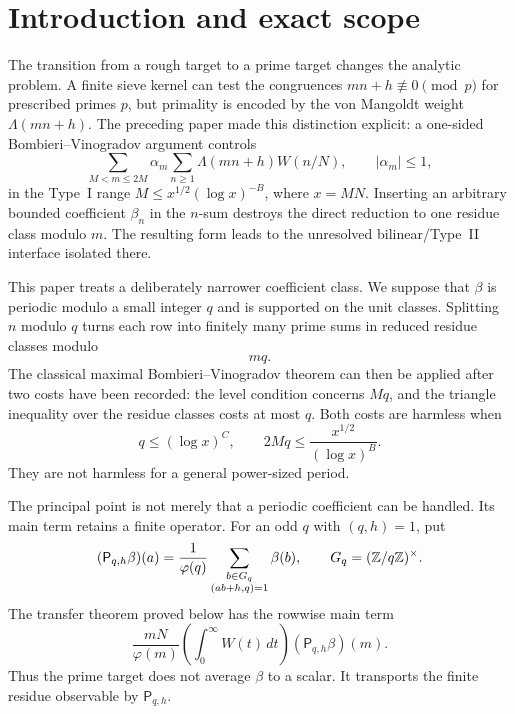 \section{Introduction and exact scope}
\label{sec:introduction}

The transition from a rough target to a prime target changes the analytic
problem.  A finite sieve kernel can test the congruences
$mn+h\not\equiv0\pmod p$ for prescribed primes $p$, but primality is encoded
by the von Mangoldt weight $\Lambda(mn+h)$.  The preceding paper
\citep{WangTPCSix2026} made this distinction explicit: a one-sided
Bombieri--Vinogradov argument controls
\begin{equation}\label{eq:intro-one-sided}
 \sum_{M<m\leq2M}\alpha_m
 \sum_{n\geq1}\Lambda(mn+h)W(n/N),
 \qquad |\alpha_m|\leq1,
\end{equation}
in the Type~I range $M\leq x^{1/2}(\log x)^{-B}$, where $x=MN$.
Inserting an arbitrary bounded coefficient $\beta_n$ in the $n$-sum destroys
the direct reduction to one residue class modulo $m$.  The resulting form
leads to the unresolved bilinear/Type~II interface isolated there.

This paper treats a deliberately narrower coefficient class.  We suppose
that $\beta$ is periodic modulo a small integer $q$ and is supported on the
unit classes.  Splitting $n$ modulo $q$ turns each row into finitely many
prime sums in reduced residue classes modulo
\begin{equation}\label{eq:intro-combined-modulus}
 mq.
\end{equation}
The classical maximal Bombieri--Vinogradov theorem can then be applied after
two costs have been recorded: the level condition concerns $Mq$, and the
triangle inequality over the residue classes costs at most $q$.  Both costs
are harmless when
\begin{equation}\label{eq:intro-safe-range}
 q\leq(\log x)^C,
 \qquad
 2Mq\leq\frac{x^{1/2}}{(\log x)^B}.
\end{equation}
They are not harmless for a general power-sized period.

The principal point is not merely that a periodic coefficient can be
handled.  Its main term retains a finite operator.  For an odd $q$ with
$(q,h)=1$, put
\begin{equation}\label{eq:intro-local-operator}
 (\mathsf P_{q,h}\beta)(a)
 =\frac1{\varphi(q)}
  \sum_{\substack{b\in G_q\\(ab+h,q)=1}}\beta(b),
 \qquad
 G_q=(\mathbb Z/q\mathbb Z)^\times.
\end{equation}
The transfer theorem proved below has the rowwise main term
\begin{equation}\label{eq:intro-row-main}
 \frac{mN}{\varphi(m)}\left(\int_0^\infty W(t)\,dt\right)
 (\mathsf P_{q,h}\beta)(m).
\end{equation}
Thus the prime target does not average $\beta$ to a scalar.  It transports
the finite residue observable by $\mathsf P_{q,h}$.


